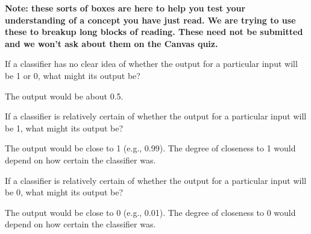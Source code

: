 \documentclass[assignment03_Solutions]{subfiles}
\begin{document}
\begin{understandingcheck}
\textbf{Note: these sorts of boxes are here to help you test your understanding of a concept you have just read.  We are trying to use these to breakup long blocks of reading.  These need not be submitted and we won't ask about them on the Canvas quiz.}
\bes
\item If a classifier has no clear idea of whether the output for a particular input will be 1 or 0, what might its output be?
\begin{boxedsolution}
The output would be about 0.5.
\end{boxedsolution}
\item If a classifier is relatively certain of whether the output for a particular input will be 1, what might its output be?
\begin{boxedsolution}
The output would be close to 1 (e.g., 0.99).  The degree of closeness to 1 would depend on how certain the classifier was.
\end{boxedsolution}
\item If a classifier is relatively certain of whether the output for a particular input will be 0, what might its output be?
\begin{boxedsolution}
The output would be close to 0 (e.g., 0.01).  The degree of closeness to 0 would depend on how certain the classifier was.
\end{boxedsolution}
\ees

\end{understandingcheck}
\end{document}
